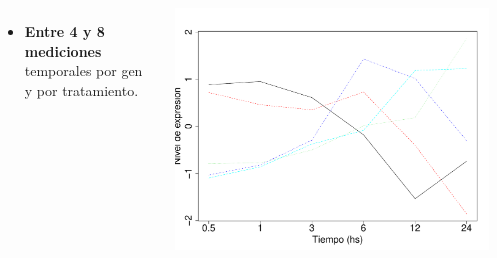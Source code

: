 \documentclass[serif,9pt, t]{beamer}
\begin{document}
\begin{frame}
\begin{columns}[T]
\begin{itemize}
				\item \textbf{Entre 4 y 8 mediciones} temporales por gen y por tratamiento.
			\end{itemize}			
			\centering	
			\includegraphics[width=0.95\textwidth]{perfiles_sin_agrupar.pdf}			
	\end{columns}
\end{frame}
\end{document}

